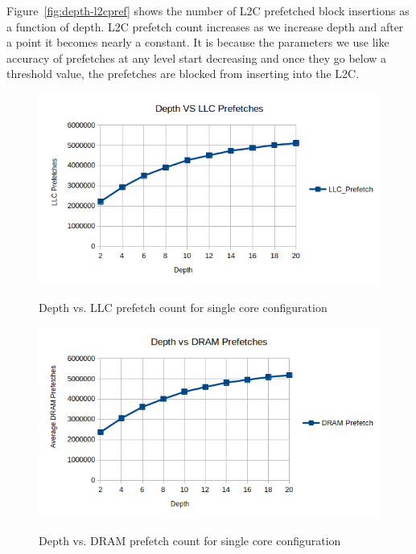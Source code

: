 Figure~\ref{fig:depth-l2cpref} shows the number of L2C prefetched block insertions as a function of depth.
L2C prefetch count increases as we increase depth and after a point it becomes nearly a constant. It is because the parameters we use like accuracy of prefetches at any level start decreasing and once they go below a threshold value, the prefetches are blocked from inserting into the L2C.
\begin{figure}[H]
{\includegraphics[scale=0.7]{images/LLC Prefetches vs Depth.png}}
\caption{Depth vs. LLC prefetch count for single core configuration}
\label{fig:depth-llcpref}
\end{figure}
\begin{figure}[H]
{\includegraphics[scale=0.7]{images/Depth VS DRAM BW.png}}
\caption{Depth vs. DRAM prefetch count for single core configuration}
\label{fig:depth-drampref}
\end{figure}

